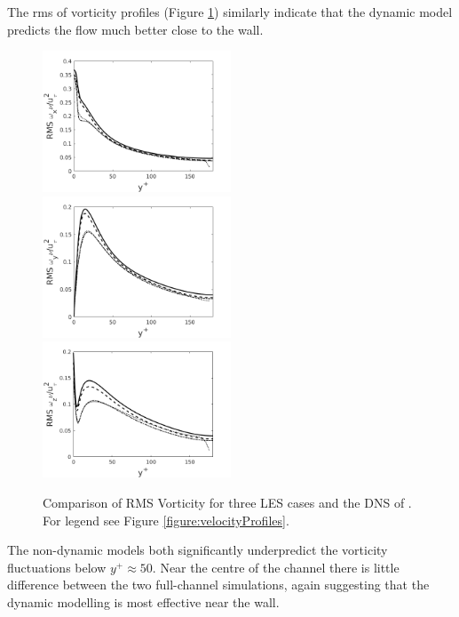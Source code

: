 \documentclass[12pt,oneside,a4paper]{article}
\begin{document}
The rms of vorticity profiles (Figure \ref{figure:rmsVorticity}) similarly indicate that the dynamic model predicts the flow much better close to the wall.
\begin{figure}[!t]
\centering
\includegraphics[width=0.5\textwidth]{images/rms_omega_x.png}\hfill
\includegraphics[width=0.5\textwidth]{images/rms_omega_y.png}\\
\includegraphics[width=0.5\textwidth]{images/rms_omega_z.png}
\caption{Comparison of RMS Vorticity for three LES cases and the DNS of \cite{vreman2014}. For legend see Figure \ref{figure:velocityProfiles}.}
\label{figure:rmsVorticity}
\end{figure}
The non-dynamic models both significantly underpredict the vorticity fluctuations below $y^+\approx 50$. Near the centre of the channel there is little difference between the two full-channel simulations, again suggesting that the dynamic modelling is most effective near the wall.
\end{document}
